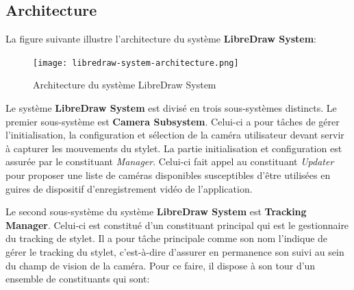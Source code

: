 \documentclass[11pt,a4paper,oldfontcommands]{memoir}
\begin{document}
\newpage

\subsection{Architecture}

La figure suivante illustre l'architecture du système \textbf{LibreDraw System}:

\begin{figure}[H]
\centering
\texttt{[image: libredraw-system-architecture.png]}
\caption{Architecture du système LibreDraw System}
\end{figure}

Le système \textbf{LibreDraw System} est divisé en trois sous-systèmes distincts. Le premier sous-système est \textbf{Camera Subsystem}. Celui-ci a pour tâches de gérer l'initialisation, la configuration et sélection de la caméra utilisateur devant servir à capturer les mouvements du stylet. La partie initialisation et configuration est assurée par le constituant \textit{Manager}. Celui-ci fait appel au constituant \textit{Updater} pour proposer une liste de caméras disponibles susceptibles d'être utilisées en guires de dispositif d'enregistrement vidéo de l'application.

Le second sous-système du système \textbf{LibreDraw System} est \textbf{Tracking Manager}. Celui-ci est constitué d'un constituant principal qui est le gestionnaire du tracking de stylet. Il a pour tâche principale comme son nom l'indique de gérer le tracking du stylet, c'est-à-dire d'assurer en permanence son suivi au sein du champ de vision de la caméra. Pour ce faire, il dispose à son tour d'un ensemble de constituants qui sont:
\end{document}
